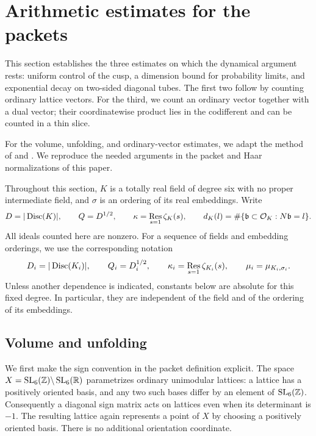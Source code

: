 \section{Arithmetic estimates for the packets}\label{sec:arithmetic}

This section establishes the three estimates on which the dynamical
argument rests: uniform control of the cusp, a dimension bound for
probability limits, and exponential decay on two-sided diagonal tubes.
The first two follow by counting ordinary lattice vectors.  For the
third, we count an ordinary vector together with a dual vector; their
coordinatewise product lies in the codifferent and can be counted in a
thin slice.

For the volume, unfolding, and ordinary-vector estimates, we adapt
the method of \cite[Sections~2--6]{PrimeDegreePackets} and
\cite[Section~3]{QuarticPackets}.  We reproduce the needed arguments
in the packet and Haar normalizations of this paper.

Throughout this section, $K$ is a totally real field of degree six with
no proper intermediate field, and $\sigma$ is an ordering of its real
embeddings.  Write
\[
 D=|\operatorname{Disc}(K)|,\qquad Q=D^{1/2},\qquad
 \kappa=\mathop{\rm Res}_{s=1}\zeta_K(s),\qquad
 d_K(l)=\#\{\mathfrak b\subset\mathcal O_K:N\mathfrak b=l\}.
\]
All ideals counted here are nonzero.  For a sequence of fields and
embedding orderings, we use the corresponding notation
\[
 D_i=|\operatorname{Disc}(K_i)|,\qquad Q_i=D_i^{1/2},\qquad
 \kappa_i=\mathop{\rm Res}_{s=1}\zeta_{K_i}(s),\qquad
 \mu_i=\mu_{K_i,\sigma_i}.
\]
Unless another dependence is indicated, constants below are absolute
for this fixed degree.  In particular, they are independent of the
field and of the ordering of its embeddings.

\subsection{Volume and unfolding}

We first make the sign convention in the packet definition explicit.
The space $X=\operatorname{SL}_6(\mathbb Z)\backslash\operatorname{SL}_6(\mathbb R)$ parametrizes ordinary
unimodular lattices: a lattice has a positively oriented basis, and
any two such bases differ by an element of $\operatorname{SL}_6(\mathbb Z)$.  Consequently
a diagonal sign matrix acts on lattices even when its determinant is
$-1$.  The resulting lattice again represents a point of $X$ by choosing
a positively oriented basis.  There is no additional orientation
coordinate.

